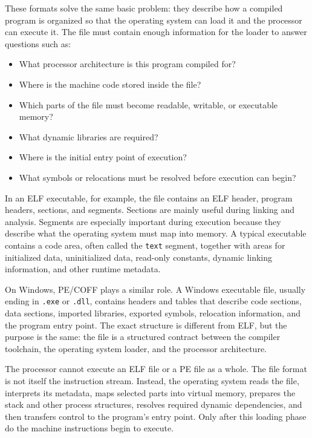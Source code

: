 \documentclass[a4paper,twoside]{report}
\begin{document}
These formats solve the same basic problem: they describe how a compiled program is organized so that the operating system can load it and the processor can execute it. The file must contain enough information for the loader to answer questions such as:

\begin{itemize}
    \item What processor architecture is this program compiled for?
    \item Where is the machine code stored inside the file?
    \item Which parts of the file must become readable, writable, or executable memory?
    \item What dynamic libraries are required?
    \item Where is the initial entry point of execution?
    \item What symbols or relocations must be resolved before execution can begin?
\end{itemize}

In an ELF executable, for example, the file contains an ELF header, program headers, sections, and segments. Sections are mainly useful during linking and analysis. Segments are especially important during execution because they describe what the operating system must map into memory. A typical executable contains a code area, often called the \texttt{text} segment, together with areas for initialized data, uninitialized data, read-only constants, dynamic linking information, and other runtime metadata.

On Windows, PE/COFF plays a similar role. A Windows executable file, usually ending in \texttt{.exe} or \texttt{.dll}, contains headers and tables that describe code sections, data sections, imported libraries, exported symbols, relocation information, and the program entry point. The exact structure is different from ELF, but the purpose is the same: the file is a structured contract between the compiler toolchain, the operating system loader, and the processor architecture.

The processor cannot execute an ELF file or a PE file as a whole. The file format is not itself the instruction stream. Instead, the operating system reads the file, interprets its metadata, maps selected parts into virtual memory, prepares the stack and other process structures, resolves required dynamic dependencies, and then transfers control to the program's entry point. Only after this loading phase do the machine instructions begin to execute.
\end{document}

